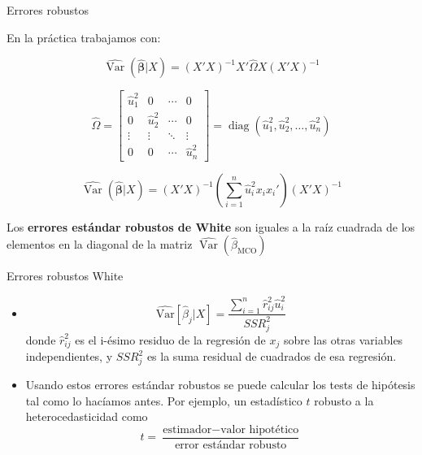 \documentclass{beamer}
\begin{document}
\begin{frame}{Errores robustos}

    En la práctica trabajamos con:

    \[
\widehat{\operatorname{Var}}(\hat{\boldsymbol{\beta}}|X) =
(X'X)^{-1} X' \hat{\Omega} X (X'X)^{-1}
\]

\[
\hat{\Omega} =
\begin{bmatrix}
\hat{u}_1^2 & 0 & \cdots & 0 \\
0 & \hat{u}_2^2 & \cdots & 0 \\
\vdots & \vdots & \ddots & \vdots \\
0 & 0 & \cdots & \hat{u}_n^2
\end{bmatrix}
= \operatorname{diag}(\hat{u}_1^2, \hat{u}_2^2, \dots, \hat{u}_n^2)
\]

\[
\widehat{\operatorname{Var}}(\hat{\boldsymbol{\beta}}|X) =
(X'X)^{-1} \left( \sum_{i=1}^n \hat{u}_i^2 x_i x_i' \right) (X'X)^{-1}
\]

    Los \textbf{errores estándar robustos de White} son iguales a la raíz cuadrada de los elementos en la diagonal de la matriz $\widehat{\operatorname{Var}}(\hat{\beta}_{\text{MCO}})$

    
\end{frame}
\begin{frame}{Errores robustos White }
    \begin{itemize}
  \item 
  \[
  \widehat{\text{Var}}[\hat{\beta}_j|X] = \frac{\sum_{i=1}^n \hat{r}_{ij}^2 \hat{u}_i^2}{SSR_j^2}
  \]
  donde $\hat{r}_{ij}^2$ es el i-ésimo residuo de la regresión de $x_j$ sobre las otras variables independientes, y $SSR_j^2$ es la suma residual de cuadrados de esa regresión.
  
  
  \item Usando estos errores estándar robustos se puede calcular los tests de hipótesis tal como lo hacíamos antes. Por ejemplo, un estadístico $t$ robusto a la heterocedasticidad como
  \[
  t = \frac{\text{estimador} - \text{valor hipotético}}{\text{error estándar robusto}}
  \]
\end{itemize}
\end{frame}



    

    
\end{document}

